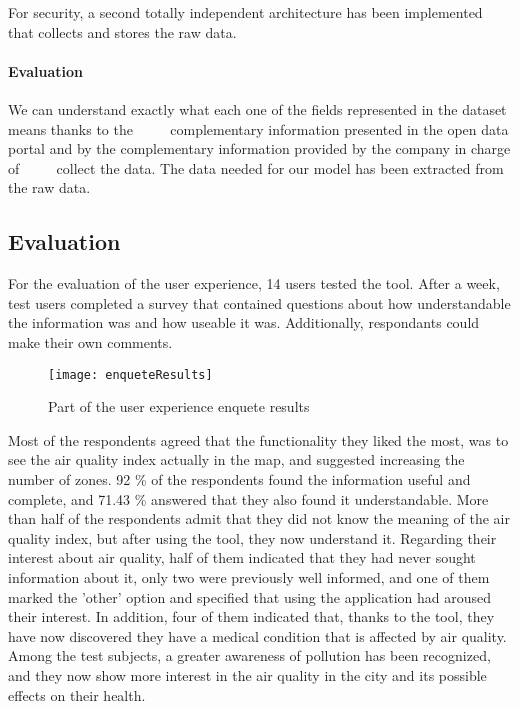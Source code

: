 For security, a second totally independent architecture has been implemented that collects and stores the raw data.

\paragraph{Evaluation} \mbox{} 

\begin{itemize}
    \done We can understand exactly what each one of the fields represented in the dataset means thanks to the 
         complementary information presented in the open data portal and by the complementary information provided by the company in charge of
         collect the data.
    \done The data needed for our model has been extracted from the raw data.
\end{itemize}

\subsection*{Evaluation}
For the evaluation of the user experience, 14 users tested the tool.
After a week, test users completed a survey that contained questions about how understandable the information was
and how useable it was. Additionally, respondants could make their own comments.
\begin{figure}[ht]
   \centering
   \texttt{[image: enqueteResults]}
   \caption{Part of the user experience enquete results}
\end{figure}

Most of the respondents agreed that the functionality they liked the most, was to see the air quality index actually in the
map, and suggested increasing the number of zones.
92 \% of the respondents found the information useful and complete, and 71.43 \% answered that they also found it
understandable.
More than half of the respondents admit that they did not know the meaning of the air quality index, but after
using the tool, they now understand it.
Regarding their interest about air quality, half of them indicated that they had never sought information about it,
only two were previously well informed, and one of them marked the 'other' option and specified that using the application had aroused their interest.
In addition, four of them indicated that, thanks to the tool, they have now discovered they have a medical condition that is affected by air quality.\\

Among the test subjects, a greater awareness of pollution has been recognized, and they now show more interest in the
air quality in the city and its possible effects on their health.

